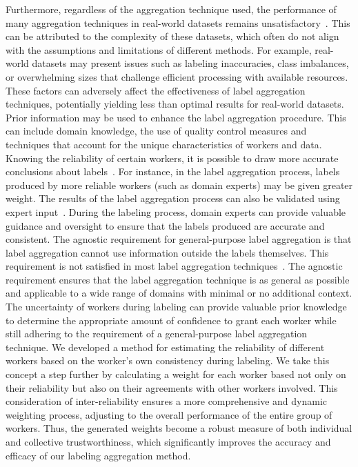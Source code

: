 Furthermore, regardless of the aggregation technique used, the performance of many aggregation techniques in real-world datasets remains unsatisfactory~\cite{liu_Exploiting_2021}. This can be attributed to the complexity of these datasets, which often do not align with the assumptions and limitations of different methods. For example, real-world datasets may present issues such as labeling inaccuracies, class imbalances, or overwhelming sizes that challenge efficient processing with available resources. These factors can adversely affect the effectiveness of label aggregation techniques, potentially yielding less than optimal results for real-world datasets.
Prior information may be used to enhance the label aggregation procedure.
This can include domain knowledge, the use of quality control measures and techniques that account for the unique characteristics of workers and data. Knowing the reliability of certain workers, it is possible to draw more accurate conclusions about labels~\cite{li_Crowdsourced_2017}. For instance, in the label aggregation process, labels produced by more reliable workers (such as domain experts) may be given greater weight. The results of the label aggregation process can also be validated using expert input~\cite{liu_Improving_2017}. During the labeling process, domain experts can provide valuable guidance and oversight to ensure that the labels produced are accurate and consistent.
The agnostic requirement for general-purpose label aggregation is that label aggregation cannot use information outside the labels themselves. This requirement is not satisfied in most label aggregation techniques~\cite{zhang_Crowdsourced_2019}. The agnostic requirement ensures that the label aggregation technique is as general as possible and applicable to a wide range of domains with minimal or no additional context.
The uncertainty of workers during labeling can provide valuable prior knowledge to determine the appropriate amount of confidence to grant each worker while still adhering to the requirement of a general-purpose label aggregation technique. We developed a method for estimating the reliability of different workers based on the worker's own consistency during labeling. We take this concept a step further by calculating a weight for each worker based not only on their reliability but also on their agreements with other workers involved. This consideration of inter-reliability ensures a more comprehensive and dynamic weighting process, adjusting to the overall performance of the entire group of workers. Thus, the generated weights become a robust measure of both individual and collective trustworthiness, which significantly improves the accuracy and efficacy of our labeling aggregation method.

